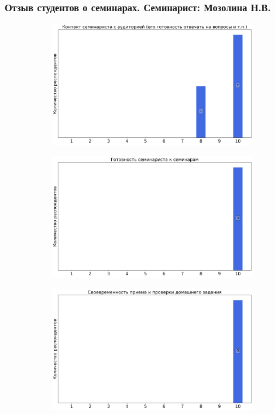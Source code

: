     \subsubsection{Отзыв студентов о семинарах. Семинарист: Мозолина Н.В.}
		\begin{figure}[H]
			\centering
			\begin{subfigure}[b]{0.45\textwidth}
				\centering
				\includegraphics[width=\textwidth]{images/4 course/Защита информации/seminarists-marks-Мозолина Н.В.-0.png}
			\end{subfigure}
			\begin{subfigure}[b]{0.45\textwidth}
				\centering
				\includegraphics[width=\textwidth]{images/4 course/Защита информации/seminarists-marks-Мозолина Н.В.-1.png}
			\end{subfigure}
			\begin{subfigure}[b]{0.45\textwidth}
				\centering
				\includegraphics[width=\textwidth]{images/4 course/Защита информации/seminarists-marks-Мозолина Н.В.-2.png}

\end{subfigure}
\end{figure}
